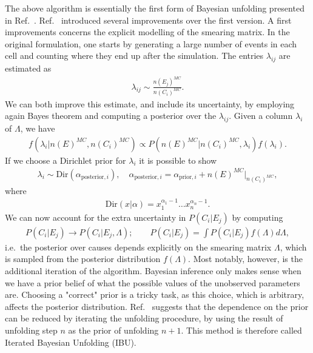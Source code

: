 The above algorithm is essentially the first form of Bayesian unfolding presented in Ref.~\cite{DAgostini:1994fjx}. Ref.~\cite{dagostini2010improved} introduced several improvements over the first version. A first improvements concerns the explicit modelling of the smearing matrix. In the original formulation, one starts by generating a large number of events in each cell and counting where they end up after the simulation. The entries $\lambda_{ij}$ are estimated as
%
\begin{align}
\lambda_{ij} \sim \frac{n(E_j)^{MC}}{n(C_i)^{MC}}.
\end{align}
%
We can both improve this estimate, and include its uncertainty, by employing again Bayes theorem and computing a posterior over the $\lambda_{ij}$. Given a column $\lambda_i$ of $\Lambda$, we have
%
\begin{align}
f(\lambda_i | n(E)^{MC}, n(C_i)^{MC}) \propto P(n(E)^{MC} | n(C_i)^{MC}, \lambda_i) f(\lambda_i).
\end{align}
%
If we choose a Dirichlet prior for $\lambda_i$ it is possible to show
%
\begin{align}
\lambda_i \sim \text{Dir}(\alpha_{\text{posterior}, i}), \quad \alpha_{\text{posterior}, i } = \alpha_{\text{prior}, i} + n(E)^{MC}|_{n(C_i)^{MC}},
\end{align}
%
where
%
\begin{align}
\text{Dir}(x | \alpha) = x_1^{\alpha_1 -1 } \ldots x_n^{\alpha_n -1 }.
\end{align}
%
We can now account for the extra uncertainty in $P(C_i | E_j)$ by computing
%
\begin{align}
P(C_i | E_j) \longrightarrow P(C_i | E_j, \Lambda); \qquad P(C_i | E_j) = \int P(C_i | E_j) f(\Lambda) d\Lambda,
\end{align}
%
i.e.\ the posterior over causes depends explicitly on the smearing matrix $\Lambda$, which is sampled from the posterior distribution $f(\Lambda)$.
Most notably, however, is the additional iteration of the algorithm. Bayesian inference only makes sense when we have a prior belief of what the possible values of the unobserved parameters are. Choosing a "correct" prior is a tricky task, as this choice, which is arbitrary, affects the posterior distribution.
Ref.~\cite{dagostini2010improved} suggests that the dependence on the prior can be reduced by iterating the unfolding procedure, by using the result of unfolding step $n$ as the prior of unfolding $n+1$. This method is therefore called Iterated Bayesian Unfolding (IBU).


